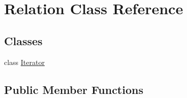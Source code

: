 \hypertarget{class_relation}{}\section{Relation Class Reference}
\label{class_relation}
\subsection*{Classes}
\begin{DoxyCompactItemize}
\item 
class \hyperlink{class_relation_1_1_iterator}{Iterator}
\end{DoxyCompactItemize}
\subsection*{Public Member Functions}
